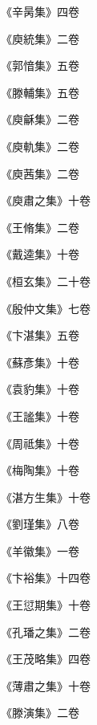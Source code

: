 \begin{pinyinscope}
 《辛昺集》四卷



 《庾統集》二卷



 《郭愔集》五卷



 《滕輔集》五卷



 《庾龢集》二卷



 《庾軌集》二卷



 《庾茜集》二卷



 《庾肅之集》十卷



 《王脩集》二卷



 《戴逵集》十卷



 《桓玄集》二十卷



 《殷仲文集》七卷



 《卞湛集》五卷



 《蘇彥集》十卷



 《袁豹集》十卷



 《王謐集》十卷



 《周祗集》十卷



 《梅陶集》十卷



 《湛方生集》十卷



 《劉瑾集》八卷



 《羊徽集》一卷



 《卞裕集》十四卷



 《王愆期集》十卷



 《孔璠之集》二卷



 《王茂略集》四卷



 《薄肅之集》十卷



 《滕演集》二卷




\end{pinyinscope}
